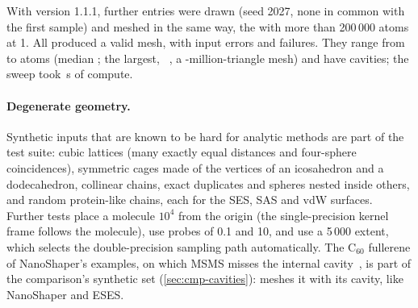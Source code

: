 With version 1.1.1,  further entries were drawn (seed 2027,
none in common with the first sample) and meshed in the same way, the
 with more than 200\,000 atoms at 1\Ang. All
 produced a valid mesh, with  input
errors and  failures. They range from
 to  atoms (median
; the largest, ~\cite{pdb9ijj}, a
-million-triangle mesh) and have  cavities; the
sweep took \,s of compute.

\paragraph{Degenerate geometry.}
Synthetic inputs that are known to be hard for analytic methods are part of
the test suite: cubic lattices (many exactly equal distances and four-sphere
coincidences), symmetric cages made of the vertices of an icosahedron and a
dodecahedron, collinear chains, exact duplicates and spheres nested inside
others, and random protein-like chains, each for the SES, SAS and vdW
surfaces. Further tests place a molecule $10^4$\Ang{} from the origin (the
single-precision kernel frame follows the molecule), use probes of 0.1 and
10\Ang, and use a 5\,000\Ang{} extent, which selects the double-precision
sampling path automatically. The C$_{60}$ fullerene of NanoShaper's examples, on which MSMS misses the
internal cavity~\cite{decherchi2013}, is part of the comparison's synthetic
set (\cref{sec:cmp-cavities}): \sesmesh{} meshes it with its cavity,
like NanoShaper and ESES.
